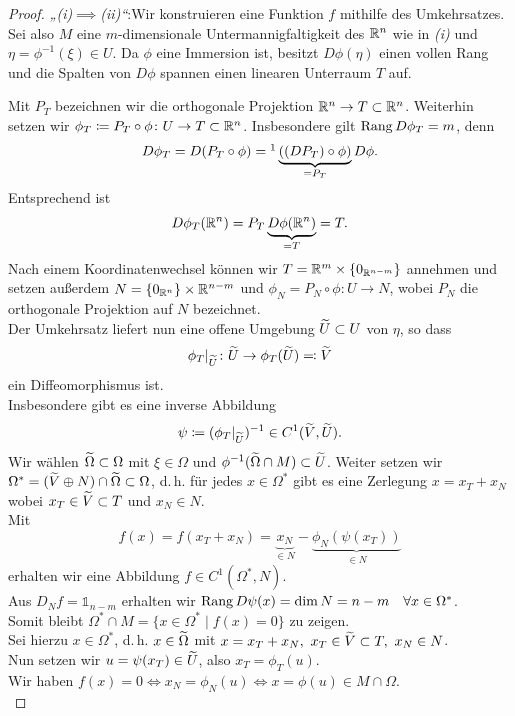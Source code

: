 \documentclass[skript.tex]{subfiles}
\begin{document}
	\begin{proof}
		\emph{„(i)$\implies$(ii)“}:\quad Wir konstruieren eine Funktion $f$ mithilfe des Umkehrsatzes.\\
		Sei also $M$ eine $m$-dimensionale Untermannigfaltigkeit des $\mathbb{R}^n$ wie in \emph{(i)} und \\
		$\eta = \phi^{-1}(\xi) \in U$. Da $\phi$ eine Immersion ist, besitzt $D \phi(\eta)$ einen vollen Rang und die Spalten von $D\phi$ spannen einen linearen Unterraum $T$ auf.
		\begin{center}
		\end{center}
		Mit $P_T$ bezeichnen wir die orthogonale Projektion $\mathbb{R}^n \to T\subset\mathbb{R}^n$. Weiterhin setzen wir $\phi_T \coloneqq P_T \circ \phi \colon U \to T \subset \mathbb{R}^n$. Insbesondere gilt $\operatorname{\operatorname{Rang}} D\phi_T = m$, denn
		\[
			D\phi_T = D(P_T \circ \phi) =\footnotemark \underbrace{((D P_T)\circ\phi)}_{= P_T} D\phi.
		\]
		Entsprechend ist
		\[
			D\phi_T(\mathbb{R}^n) = P_T\underbrace{D\phi(\mathbb{R}^n)}_{= T}=T.
		\]
		Nach einem Koordinatenwechsel können wir $T=\mathbb{R}^m\times\{0_{\mathbb{R}^{n-m}}\}$ annehmen und setzen außerdem $N = \{0_{\mathbb{R}^{n}}\}\times\mathbb{R}^{n-m}$ und $\phi_N = P_N \circ \phi \colon U \to N$, wobei $P_N$ die orthogonale Projektion auf $N$ bezeichnet.\\
		Der Umkehrsatz liefert nun eine offene Umgebung $\widetilde{U} \subset U$ von $\eta$, so dass
		\[
			\phi_T|_{\widetilde{U}} \colon \widetilde{U} \to \phi_T(\widetilde{U}) \eqqcolon \widetilde{V}
		\]
		ein Diffeomorphismus ist.\\
		Insbesondere gibt es eine inverse Abbildung
		\[
			\psi \coloneqq (\phi_T|_{\widetilde{U}})^{-1} \in C^1(\widetilde{V},\widetilde{U}).
		\]
		Wir wählen $\widetilde{\Omega} \subset \Omega$ mit $\xi \in \Omega$ und $\phi^{-1}(\widetilde{\Omega} \cap M) \subset \widetilde{U}$. Weiter setzen wir $\Omega^\ast=(\widetilde{V} \oplus N)\cap\widetilde{\Omega} \subset \Omega$, d.\,h. für jedes $x\in\Omega^\ast$ gibt es eine Zerlegung $x=x_T+x_N$ wobei $x_T \in \widetilde{V} \subset T$ und $x_N \in N$.\\
		Mit
		\[
			f(x) = f(x_T+x_N) = \underbrace{x_N}_{\in N}-\underbrace{\phi_N(\psi(x_T))}_{\in N}
		\]
		erhalten wir eine Abbildung $f \in C^1(\Omega^\ast,N)$.\\
		Aus $D_N f = \mathds{1}_{n-m}$ erhalten wir $\operatorname{\operatorname{Rang}} D\psi(x) = \dim N = n-m \quad\forall x \in \Omega^\ast$.\\
		Somit bleibt $\Omega^\ast \cap M = \{x\in\Omega^\ast \mid f(x) = 0\}$ zu zeigen.\\
		Sei hierzu $x \in \Omega^\ast$, d.\,h. $x \in \widetilde{\Omega}$ mit $x = x_T+x_N,\ x_T\in\widetilde{V}\subset T,\ x_N \in N$.\\
		Nun setzen wir $u=\psi(x_T)\in\widetilde{U}$, also $x_T = \phi_T(u)$.\\
		Wir haben $f(x)=0 \iff x_N = \phi_N(u) \iff x = \phi(u) \in M \cap \Omega$.\\
		

\end{proof}
\end{document}
